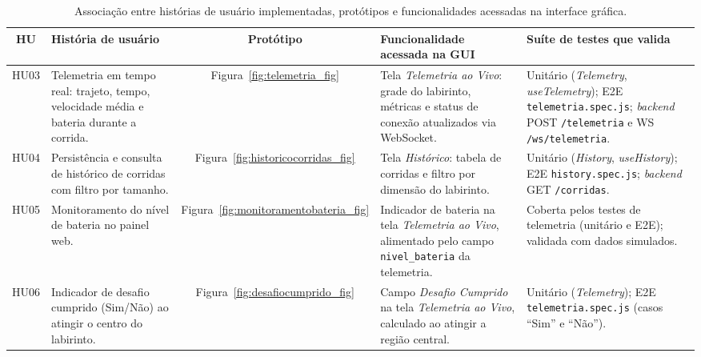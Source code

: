 \begin{table}[H]
    \centering
    \caption{Associação entre histórias de usuário implementadas, protótipos e
    funcionalidades acessadas na interface gráfica.}
    \label{tab:hu_prototipo_gui}
    \footnotesize
    \begin{tabular}{|c|p{3.6cm}|c|p{3.6cm}|p{3.4cm}|}
        \hline
        \textbf{HU} & \textbf{História de usuário} & \textbf{Protótipo} &
        \textbf{Funcionalidade acessada na GUI} &
        \textbf{Suíte de testes que valida} \\ \hline

        HU03 & Telemetria em tempo real: trajeto, tempo, velocidade média e
        bateria durante a corrida. & Figura~\ref{fig:telemetria_fig} &
        Tela \textit{Telemetria ao Vivo}: grade do labirinto,
        métricas e status de conexão atualizados via WebSocket. &
        Unitário (\textit{Telemetry}, \textit{useTelemetry}); E2E
        \texttt{telemetria.spec.js}; \textit{backend} POST \texttt{/telemetria}
        e WS \texttt{/ws/telemetria}. \\ \hline

        HU04 & Persistência e consulta de histórico de corridas com filtro por
        tamanho. & Figura~\ref{fig:historicocorridas_fig} &
        Tela \textit{Histórico}: tabela de corridas
        e filtro por dimensão do labirinto. &
        Unitário (\textit{History}, \textit{useHistory}); E2E
        \texttt{history.spec.js}; \textit{backend} GET \texttt{/corridas}. \\ \hline

        HU05 & Monitoramento do nível de bateria no painel web. &
        Figura~\ref{fig:monitoramentobateria_fig} &
        Indicador de bateria na tela \textit{Telemetria ao Vivo}, alimentado pelo 
        campo \texttt{nivel\_bateria} da telemetria. &
        Coberta pelos testes de telemetria (unitário e E2E); validada com dados
        simulados. \\ \hline

        HU06 & Indicador de desafio cumprido (Sim/Não) ao atingir o centro do
        labirinto. & Figura~\ref{fig:desafiocumprido_fig} &
        Campo \textit{Desafio Cumprido} na tela \textit{Telemetria ao Vivo}, 
        calculado ao atingir a região central. &
        Unitário (\textit{Telemetry}); E2E \texttt{telemetria.spec.js}
        (casos ``Sim'' e ``Não''). \\ \hline
    \end{tabular}
\end{table}

